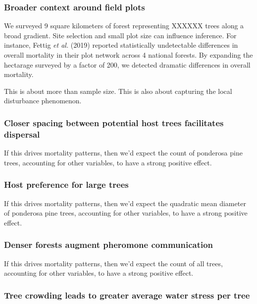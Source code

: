 \documentclass[]{article}
\begin{document}
\subsubsection{Broader context around field
plots}\label{broader-context-around-field-plots}

We surveyed 9 square kilometers of forest representing XXXXXX trees
along a broad gradient. Site selection and small plot size can influence
inference. For instance, Fettig \emph{et al.} (2019) reported
statistically undetectable differences in overall mortality in their
plot network across 4 national forests. By expanding the hectarage
surveyed by a factor of 200, we detected dramatic differences in overall
mortality.

This is about more than sample size. This is also about capturing the
local disturbance phenomenon.

\subsubsection{Closer spacing between potential host trees facilitates
dispersal}\label{closer-spacing-between-potential-host-trees-facilitates-dispersal}

If this drives mortality patterns, then we'd expect the count of
ponderosa pine trees, accounting for other variables, to have a strong
positive effect.

\subsubsection{Host preference for large
trees}\label{host-preference-for-large-trees}

If this drives mortality patterns, then we'd expect the quadratic mean
diameter of ponderosa pine trees, accounting for other variables, to
have a strong positive effect.

\subsubsection{Denser forests augment pheromone
communication}\label{denser-forests-augment-pheromone-communication}

If this drives mortality patterns, then we'd expect the count of all
trees, accounting for other variables, to have a strong positive effect.

\subsubsection{Tree crowding leads to greater average water stress per
tree}\label{tree-crowding-leads-to-greater-average-water-stress-per-tree}
\end{document}

